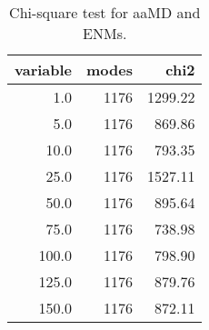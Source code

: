 \begin{table}[center]
\centering
\caption{Chi-square test for aaMD and ENMs.}
\label{tab:chi2}
\begin{tabular}{rrr}
\toprule
 variable &  modes &    chi2 \\
\midrule
      1.0 &   1176 & 1299.22 \\
      5.0 &   1176 &  869.86 \\
     10.0 &   1176 &  793.35 \\
     25.0 &   1176 & 1527.11 \\
     50.0 &   1176 &  895.64 \\
     75.0 &   1176 &  738.98 \\
    100.0 &   1176 &  798.90 \\
    125.0 &   1176 &  879.76 \\
    150.0 &   1176 &  872.11 \\
\bottomrule
\end{tabular}
\end{table}
